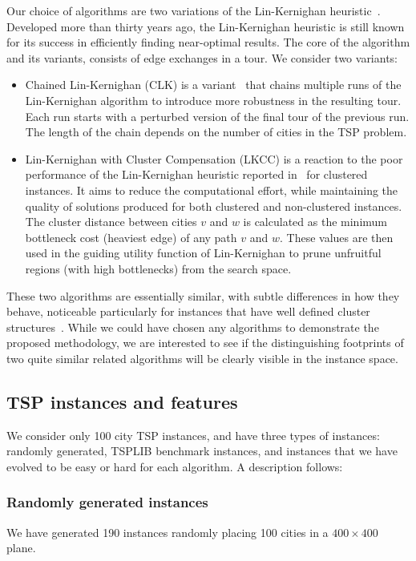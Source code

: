 \documentclass[conference]{IEEEtran}
\begin{document}
Our choice of algorithms are two variations of the Lin-Kernighan heuristic~\cite{LinKernighan}. Developed more than thirty years ago, the Lin-Kernighan heuristic is still known for its success in efficiently finding near-optimal results. The core of the algorithm and its variants, consists of edge exchanges in a tour. We consider two variants:
\begin{itemize}[labelsep=0.75, leftmargin=\parindent, topsep=0pt, itemsep=\parskip]
\item Chained Lin-Kernighan (CLK) is a variant~\cite{CLK} that chains multiple runs of the Lin-Kernighan algorithm to introduce more robustness in the resulting tour. Each run starts with a perturbed version of the final tour of the previous run. The length of the chain depends on the number of cities in the TSP problem.
\item Lin-Kernighan with Cluster Compensation (LKCC) is a reaction to the poor performance of the Lin-Kernighan heuristic reported in~\cite{TspCaseStudy} for clustered instances. It aims to reduce the computational effort, while maintaining the quality of solutions produced for both clustered and non-clustered instances. The cluster distance between cities $v$ and $w$ is calculated as the minimum bottleneck cost (heaviest edge) of any path $v$ and $w$. These values are then used in the guiding utility function of Lin-Kernighan to prune unfruitful regions (with high bottlenecks) from the search space.
\end{itemize}
These two algorithms are essentially similar, with subtle differences in how they behave, noticeable particularly for instances that have well defined cluster structures~\cite{AMAI}. While we could have chosen any algorithms to demonstrate the proposed methodology, we are interested to see if the distinguishing footprints of two quite similar related algorithms will be clearly visible in the instance space.

\subsection{TSP instances and features}
We consider only 100 city TSP instances, and have three types of instances: randomly generated, TSPLIB benchmark instances, and instances that we have evolved to be easy or hard for each algorithm. A description follows:
\subsubsection{Randomly generated instances}  \label{thisplace} \edef\thissubsubsection{\thesubsubsectiondis}
We have generated 190 instances randomly placing 100 cities in a $400 \times 400$ plane.
\end{document}
